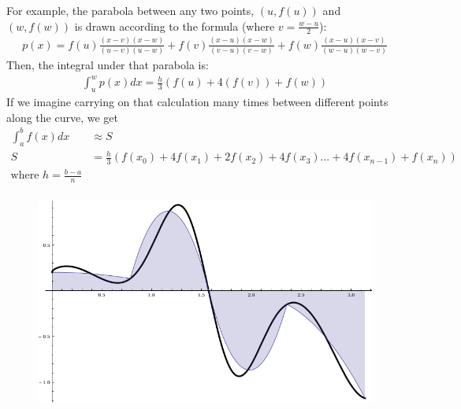 \documentclass[
]{article}
\begin{document}
For example, the parabola between any two points, \((u, f(u))\) and
\((w, f(w))\) is drawn according to the formula (where
\(v=\frac{w-u}{2}\)): \begin{align*} 
p(x) = f(u) \frac{(x-v)(x-w)}{(u-v)(u-w)} +f(v) \frac{(x-u)(x-w)}{(v-u)(v-w)} + f(w) \frac{(x-u)(x-v)}{(w-u)(w-v)}
\end{align*} Then, the integral under that parabola is: \begin{align*} 
 \int_u^w p(x)dx = \frac{h}{3}(f(u) + 4(f(v)) + f(w))
\end{align*} If we imagine carrying on that calculation many times
between different points along the curve, we get \begin{align*} 
 \int_a^b f(x) dx & \approx S\\
  S &= \frac{h}{3}(f(x_0) + 4f(x_1) + 2f(x_2) + 4f(x_3)... + 4f(x_{n-1}) + f(x_n))\\
  \text{where } h=\frac{b-a}{n}\\
\end{align*}

\begin{figure}[h!]\centering 
\includegraphics[width=0.6\linewidth]{simpson.png} 
\end{figure}
\end{document}
